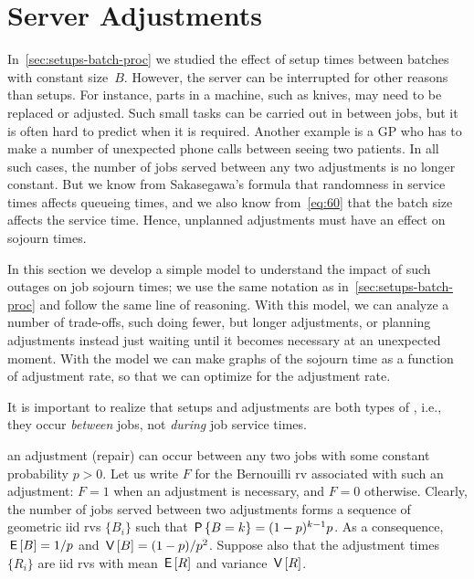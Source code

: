 


\section{Server Adjustments}
\label{sec:non-preempt-interr}


In~\cref{sec:setups-batch-proc} we studied the effect of setup times between batches with constant size~$B$.
However, the server can be interrupted for other reasons than setups.
For instance, parts in a machine, such as knives, may need to be replaced or adjusted.
Such small tasks can be carried out in between jobs, but it is often hard to predict when it is required.
Another example is a GP who  has to make a number of unexpected phone calls between seeing two patients.
In all such cases, the number of jobs
served between any two adjustments
is no longer constant.
But we know from Sakasegawa's formula that randomness in service times affects queueing times, and we also know from~\cref{eq:60} that the batch size affects the service time.
Hence, unplanned adjustments must have an effect on sojourn times.


In this section we develop a simple model to understand the impact of such outages on job sojourn times; we use the same notation as in~\cref{sec:setups-batch-proc} and follow the same line of reasoning.
With this model, we can analyze a number of trade-offs, such doing fewer, but longer adjustments, or planning adjustments instead just waiting until it becomes necessary at an unexpected moment. With the model we can make graphs of the sojourn time as a function of adjustment rate, so that we can optimize for the adjustment rate.

It is important to realize that setups and adjustments are both types of , i.e., they occur \emph{between} jobs, not \emph{during}  job service times.


 an adjustment (repair) can occur between any two jobs with some constant probability $p>0$. Let us write $F$ for the Bernouilli rv associated with such an adjustment: $F=1$ when an adjustment is necessary, and $F=0$ otherwise. Clearly,  the number of jobs served between two adjustments forms a sequence of geometric iid rvs $\{B_i\}$ such that $\P{B=k} = (1-p)^{k-1}p$.
As a consequence, $\E B=1/p$ and $\V B = (1-p)/p^2$. Suppose also that the adjustment times  $\{R_{i}\}$ are iid rvs with mean $\E R$ and variance $\V R$.

